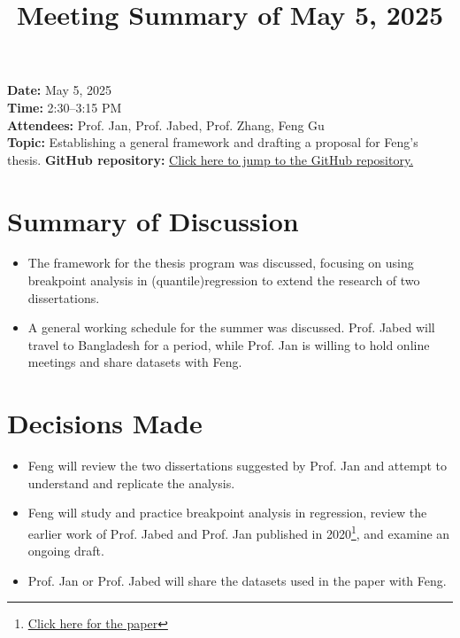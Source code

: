 \documentclass[11pt]{article}
\title{Meeting Summary of May 5, 2025}
\date{}  %
\author{}
\begin{document}
\maketitle

\noindent
\textbf{Date:} May 5, 2025 \\
\textbf{Time:} 2:30--3:15 PM \\
\textbf{Attendees:} Prof. Jan, Prof. Jabed, Prof. Zhang, Feng Gu \\
\textbf{Topic:} Establishing a general framework and drafting a proposal for Feng's thesis.
\textbf{GitHub repository:} \href{https://github.com/Gufeng-2002/Thesis_Meeting_Notes/tree/main/May_5th_25_meeting1}{Click here to jump to the GitHub repository.}

\vspace{1em}

\section*{Summary of Discussion}
\begin{itemize}[leftmargin=1.5em]
    \item The framework for the thesis program was discussed, focusing on using breakpoint analysis in (quantile)regression to extend the research of two dissertations.
    \item A general working schedule for the summer was discussed. Prof. Jabed will travel to Bangladesh for a period, while Prof. Jan is willing to hold online meetings and share datasets with Feng.
\end{itemize}

\section*{Decisions Made}
\begin{itemize}[leftmargin=1.5em]
    \item Feng will review the two dissertations suggested by Prof. Jan and attempt to understand and replicate the analysis.
    \item Feng will study and practice breakpoint analysis in regression, review the earlier work of Prof. Jabed and Prof. Jan published in 2020\footnote{\href{https://onlinelibrary.wiley.com/doi/epdf/10.1002/ece3.6955}{Click here for the paper}}, and examine an ongoing draft.
    \item Prof. Jan or Prof. Jabed will share the datasets used in the paper with Feng.
\end{itemize}
\end{document}
